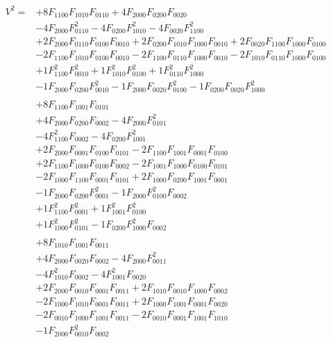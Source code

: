 \documentclass[12pt]{article}
\begin{document}
\begin{equation}
\begin{aligned}
V^2 = &
+8 F_{1100} F_{1010} F_{0110}
+4 F_{2000} F_{0200} F_{0020}
\\ &
-4 F_{2000} F_{0110}^2
-4 F_{0200} F_{1010}^2
-4 F_{0020} F_{1100}^2
\\ &
+2 F_{2000} F_{0110} F_{0100} F_{0010}
+2 F_{0200} F_{1010} F_{1000} F_{0010}
+2 F_{0020} F_{1100} F_{1000} F_{0100}
\\ &
-2 F_{1100} F_{1010} F_{0100} F_{0010}
-2 F_{1100} F_{0110} F_{1000} F_{0010}
-2 F_{1010} F_{0110} F_{1000} F_{0100}
\\ &
+1 F_{1100}^2 F_{0010}^2
+1 F_{1010}^2 F_{0100}^2
+1 F_{0110}^2 F_{1000}^2
\\ &
-1 F_{2000} F_{0200} F_{0010}^2
-1 F_{2000} F_{0020} F_{0100}^2
-1 F_{0200} F_{0020} F_{1000}^2
\\ &
\\ &
+8 F_{1100} F_{1001} F_{0101}
\\ &
+4 F_{2000} F_{0200} F_{0002}
-4 F_{2000} F_{0101}^2
\\ &
-4 F_{1100}^2 F_{0002}
-4 F_{0200} F_{1001}^2
\\ &
+2 F_{2000} F_{0001} F_{0100} F_{0101}
-2 F_{1100} F_{1001} F_{0001} F_{0100}
\\ &
+2 F_{1100} F_{1000} F_{0100} F_{0002}
-2 F_{1001} F_{1000} F_{0100} F_{0101}
\\ &
-2 F_{1000} F_{1100} F_{0001} F_{0101}
+2 F_{1000} F_{0200} F_{1001} F_{0001}
\\ &
-1 F_{2000} F_{0200} F_{0001}^2
-1 F_{2000} F_{0100}^2 F_{0002}
\\ &
+1 F_{1100}^2 F_{0001}^2
+1 F_{1001}^2 F_{0100}^2
\\ &
+1 F_{1000}^2 F_{0101}^2
-1 F_{0200} F_{1000}^2 F_{0002}
\\ &
\\ &
+8 F_{1010} F_{1001} F_{0011}
\\ &
+4 F_{2000} F_{0020} F_{0002}
-4 F_{2000} F_{0011}^2
\\ &
-4 F_{1010}^2 F_{0002}
-4 F_{1001}^2 F_{0020}
\\ &
+2 F_{2000} F_{0010} F_{0001} F_{0011}
+2 F_{1010} F_{0010} F_{1000} F_{0002}
\\ &
-2 F_{1000} F_{1010} F_{0001} F_{0011}
+2 F_{1000} F_{1001} F_{0001} F_{0020}
\\ &
-2 F_{0010} F_{1000} F_{1001} F_{0011}
-2 F_{0010} F_{0001} F_{1001} F_{1010}
\\ &
-1 F_{2000} F_{0010}^2 F_{0002}

\end{aligned}
\end{equation}
\end{document}
